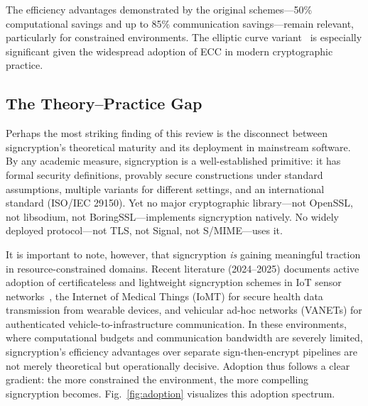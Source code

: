 \documentclass[conference]{IEEEtran}
\begin{document}
The efficiency advantages demonstrated by the original schemes---50\% computational savings and up to 85\% communication savings---remain relevant, particularly for constrained environments. The elliptic curve variant~\cite{zheng1998} is especially significant given the widespread adoption of ECC in modern cryptographic practice.

\subsection{The Theory--Practice Gap}

Perhaps the most striking finding of this review is the disconnect between signcryption's theoretical maturity and its deployment in mainstream software. By any academic measure, signcryption is a well-established primitive: it has formal security definitions, provably secure constructions under standard assumptions, multiple variants for different settings, and an international standard (ISO/IEC 29150). Yet no major cryptographic library---not OpenSSL, not libsodium, not BoringSSL---implements signcryption natively. No widely deployed protocol---not TLS, not Signal, not S/MIME---uses it.

It is important to note, however, that signcryption \textit{is} gaining meaningful traction in resource-constrained domains. Recent literature (2024--2025) documents active adoption of certificateless and lightweight signcryption schemes in IoT sensor networks~\cite{iotsigncryption2025}, the Internet of Medical Things (IoMT) for secure health data transmission from wearable devices, and vehicular ad-hoc networks (VANETs) for authenticated vehicle-to-infrastructure communication. In these environments, where computational budgets and communication bandwidth are severely limited, signcryption's efficiency advantages over separate sign-then-encrypt pipelines are not merely theoretical but operationally decisive. Adoption thus follows a clear gradient: the more constrained the environment, the more compelling signcryption becomes. Fig.~\ref{fig:adoption} visualizes this adoption spectrum.
\end{document}
